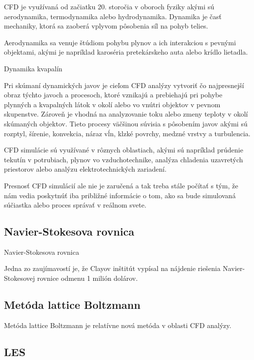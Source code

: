 \documentclass[]{tukediphc}
\begin{document}
CFD je využívaná od začiatku 20. storočia v oboroch fyziky akými sú aerodynamika, termodynamika alebo hydrodynamika. Dynamika je časť mechaniky, ktorá sa zaoberá vplyvom pôsobenia síl na pohyb telies.

Aerodynamika sa venuje štúdiom pohybu plynov a ich interakciou s pevnými objektami, akými je napríklad karoséria pretekárskeho auta alebo krídlo lietadla. 

Dynamika kvapalín

Pri skúmaní dynamických javov je cieľom CFD analýzy vytvoriť čo najpresnejší obraz týchto javoch a procesoch, ktoré vznikajú a prebiehajú pri pohybe plynných a kvapalných látok v okolí alebo vo vnútri objektov v pevnom skupenstve. Zároveň je vhodná na analyzovanie toku alebo zmeny teploty v okolí skúmaných objektov. Tieto procesy väčšinou súvisia s pôsobením javov akými sú rozptyl, šírenie, konvekcia, náraz vĺn, klzké povrchy, medzné vrstvy a turbulencia.



CFD simulácie sú využívané v rôznych oblastiach, akými sú napríklad prúdenie tekutín v potrubiach, plynov vo vzduchotechnike, analýza chladenia uzavretých priestorov alebo analýzu elektrotechnických zariadení.

Presnosť CFD simulácií ale nie je zaručená a tak treba stále počítať s tým, že nám vedia poskytnúť iba približné informácie o tom, ako sa bude simulovaná súčiastka alebo proces správať v reálnom svete. 


\subsection{Navier-Stokesova rovnica}

Navier-Stokesova rovnica

Jedna zo zaujímavostí je, že Clayov inštitút vypísal na nájdenie riešenia Navier-Stokesovej rovnice odmenu 1 milión dolárov. 

\subsection{Metóda lattice Boltzmann}

Metóda lattice Boltzmann je relatívne nová metóda v oblasti CFD analýzy.

\subsection{LES}
\end{document}
